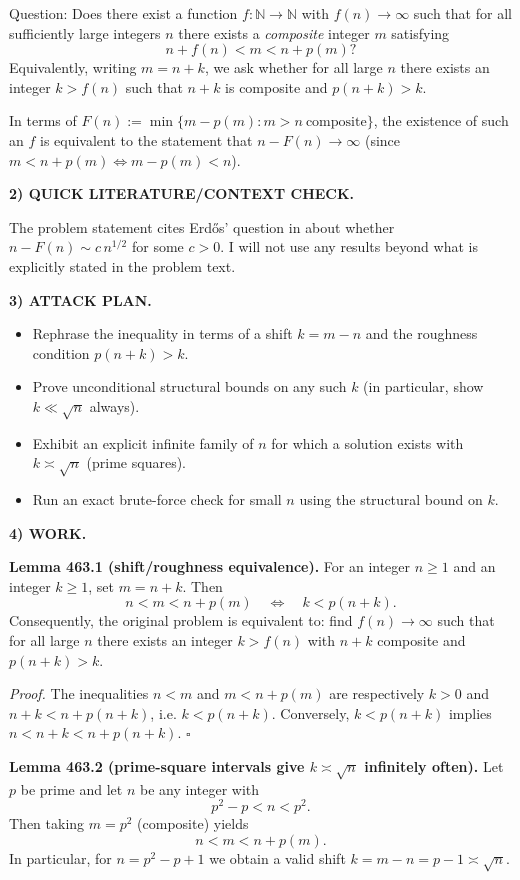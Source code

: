 Question: Does there exist a function $f:\mathbb{N}\to\mathbb{N}$ with $f(n)\to\infty$ such that for all sufficiently large integers $n$ there exists a \emph{composite} integer $m$ satisfying
\[
 n+f(n)<m<n+p(m)?
\]
Equivalently, writing $m=n+k$, we ask whether for all large $n$ there exists an integer $k>f(n)$ such that $n+k$ is composite and $p(n+k)>k$.

In terms of $F(n):=\min\{m-p(m): m>n\ \text{composite}\}$, the existence of such an $f$ is equivalent to the statement that $n-F(n)\to\infty$ (since $m<n+p(m)\iff m-p(m)<n$).

\medskip
\noindent\textbf{2) QUICK LITERATURE/CONTEXT CHECK.}

The problem statement cites Erd\H{o}s' question in \cite{Er92e} about whether $n-F(n)\sim c\,n^{1/2}$ for some $c>0$. I will not use any results beyond what is explicitly stated in the problem text.

\medskip
\noindent\textbf{3) ATTACK PLAN.}

\begin{itemize}
\item Rephrase the inequality in terms of a shift $k=m-n$ and the roughness condition $p(n+k)>k$.
\item Prove unconditional structural bounds on any such $k$ (in particular, show $k\ll \sqrt{n}$ always).
\item Exhibit an explicit infinite family of $n$ for which a solution exists with $k\asymp \sqrt{n}$ (prime squares).
\item Run an exact brute-force check for small $n$ using the structural bound on $k$.
\end{itemize}

\medskip
\noindent\textbf{4) WORK.}

\noindent\textbf{Lemma 463.1 (shift/roughness equivalence).}
For an integer $n\ge 1$ and an integer $k\ge 1$, set $m=n+k$. Then
\[
 n<m<n+p(m)\quad\Longleftrightarrow\quad k<p(n+k).
\]
Consequently, the original problem is equivalent to: find $f(n)\to\infty$ such that for all large $n$ there exists an integer $k>f(n)$ with $n+k$ composite and $p(n+k)>k$.

\textit{Proof.}
The inequalities $n<m$ and $m<n+p(m)$ are respectively $k>0$ and $n+k<n+p(n+k)$, i.e. $k<p(n+k)$. Conversely, $k<p(n+k)$ implies $n<n+k<n+p(n+k)$. \hfill$\square$

\medskip
\noindent\textbf{Lemma 463.2 (prime-square intervals give $k\asymp\sqrt{n}$ infinitely often).}
Let $p$ be prime and let $n$ be any integer with
\[
 p^2-p<n<p^2.
\]
Then taking $m=p^2$ (composite) yields
\[
 n<m<n+p(m).
\]
In particular, for $n=p^2-p+1$ we obtain a valid shift $k=m-n=p-1\asymp \sqrt{n}$.

